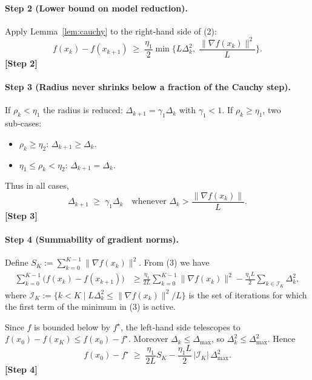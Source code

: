 \documentclass{article}
\begin{document}
\paragraph{Step 2 (Lower bound on model reduction).}  
Apply Lemma~\ref{lem:cauchy} to the right‑hand side of (2):
\[
f(x_k)-f(x_{k+1})\;\ge\;
\frac{\eta_1}{2}\min\!\Big\{L\Delta_k^2,\;\frac{\|\nabla f(x_k)\|^2}{L}\Big\}.   \tag{3}
\]
\textbf{[Step 2]}

\paragraph{Step 3 (Radius never shrinks below a fraction of the Cauchy step).}  
If $\rho_k<\eta_1$ the radius is reduced: $\Delta_{k+1}=\gamma_1\Delta_k$ with $\gamma_1<1$.  
If $\rho_k\ge\eta_1$, two sub‑cases:

\begin{itemize}
\item $\rho_k\ge\eta_2$: $\Delta_{k+1}\ge\Delta_k$.
\item $\eta_1\le\rho_k<\eta_2$: $\Delta_{k+1}=\Delta_k$.
\end{itemize}
Thus in all cases,
\[
\Delta_{k+1}\;\ge\;\gamma_1\Delta_k\quad\text{whenever } \Delta_k>\frac{\|\nabla f(x_k)\|}{L}. \tag{4}
\]
\textbf{[Step 3]}

\paragraph{Step 4 (Summability of gradient norms).}  
Define $S_K:=\sum_{k=0}^{K-1}\|\nabla f(x_k)\|^2$.  
From (3) we have
\[
\begin{aligned}
\sum_{k=0}^{K-1}\big(f(x_k)-f(x_{k+1})\big)
&\ge \frac{\eta_1}{2L}\sum_{k=0}^{K-1}\|\nabla f(x_k)\|^2
      -\frac{\eta_1 L}{2}\sum_{k\in\mathcal I_K}\Delta_k^2,
\end{aligned}
\tag{5}
\]
where $\mathcal I_K:=\{k< K\mid L\Delta_k^2\le \|\nabla f(x_k)\|^2/L\}$ is the set of iterations for which the first term of the minimum in (3) is active.

Since $f$ is bounded below by $f^\star$, the left‑hand side telescopes to $f(x_0)-f(x_K)\le f(x_0)-f^\star$.  Moreover $\Delta_k\le\Delta_{\max}$, so $\Delta_k^2\le\Delta_{\max}^2$.  Hence
\[
f(x_0)-f^\star\;\ge\;\frac{\eta_1}{2L}S_K-\frac{\eta_1 L}{2}\,|\mathcal I_K|\,\Delta_{\max}^2 .
\tag{6}
\]
\textbf{[Step 4]}
\end{document}
